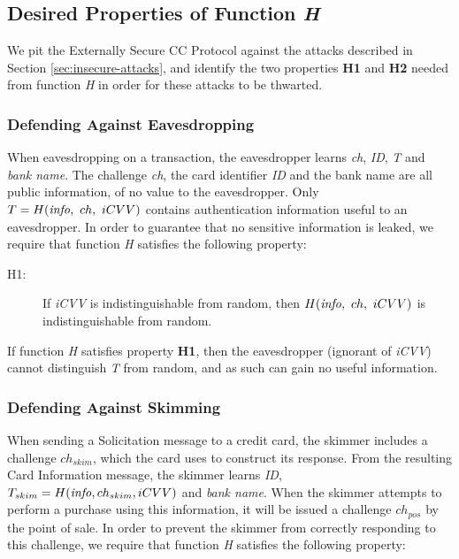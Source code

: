 \subsection{Desired Properties of Function \emph{H}}
\label{external-h-properties}

We pit the Externally Secure CC Protocol against the attacks described in Section \ref{sec:insecure-attacks},
	and identify the two properties \textbf{H1} and \textbf{H2} needed from function \emph{H} in order for these attacks to be thwarted.

\subsubsection*{Defending Against Eavesdropping}
When eavesdropping on a transaction, the eavesdropper learns \emph{ch}, \emph{ID}, \emph{T} and \emph{bank name}.
The challenge \emph{ch}, the card identifier \emph{ID} and the bank name are all public information, of no value to the eavesdropper.
Only $T = H(\textrm{\emph{info}},~ ch,~ iCVV)$ contains authentication information useful to an eavesdropper.
In order to guarantee that no sensitive information is leaked, we require that function \emph{H} satisfies the following property:

\begin{description}
\item[H1:] If \emph{iCVV} is indistinguishable from random, then $H(\textrm{\emph{info}},~ ch,~ iCVV)$ is indistinguishable from random.
\end{description}

If function \emph{H} satisfies property \textbf{H1}, then the eavesdropper (ignorant of \emph{iCVV}) cannot distinguish \emph{T} from random, and as such can gain no useful information.








\subsubsection*{Defending Against Skimming}
When sending a Solicitation message to a credit card, the skimmer includes a challenge $ch_{skim}$, which the card uses to construct its response.
From the resulting Card Information message, the skimmer learns \emph{ID}, $T_{skim} = H(\textrm{\emph{info}}, ch_{skim}, iCVV)$ and \emph{bank name}.
When the skimmer attempts to perform a purchase using this information, it will be issued a challenge $ch_{pos}$ by the point of sale.
In order to prevent the skimmer from correctly responding to this challenge, we require that function \emph{H} satisfies the following property:

